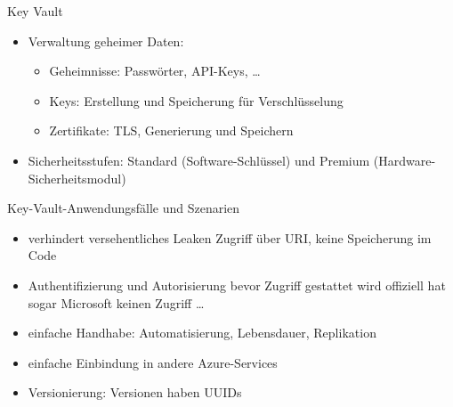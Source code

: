 

\begin{flashcard}[Definition]{Key Vault}
  \begin{itemize}
    \item Verwaltung geheimer Daten:
    \begin{itemize}
      \item Geheimnisse: Passwörter, API-Keys, \ldots
      \item Keys: Erstellung und Speicherung für Verschlüsselung
      \item Zertifikate: TLS, Generierung und Speichern
    \end{itemize}
    \item Sicherheitsstufen: Standard (Software-Schlüssel) und Premium (Hardware-Sicherheitsmodul)
  \end{itemize}
\end{flashcard}

\begin{flashcard}[Definition]{Key-Vault-Anwendungsfälle und Szenarien}
  \begin{itemize}
    \item verhindert versehentliches Leaken\newline
      Zugriff über URI, keine Speicherung im Code
    \item Authentifizierung und Autorisierung bevor Zugriff gestattet wird\newline
      offiziell hat sogar Microsoft keinen Zugriff \ldots
    \item einfache Handhabe: Automatisierung, Lebensdauer, Replikation
    \item einfache Einbindung in andere Azure-Services
    \item Versionierung: Versionen haben UUIDs
  \end{itemize}
\end{flashcard}

